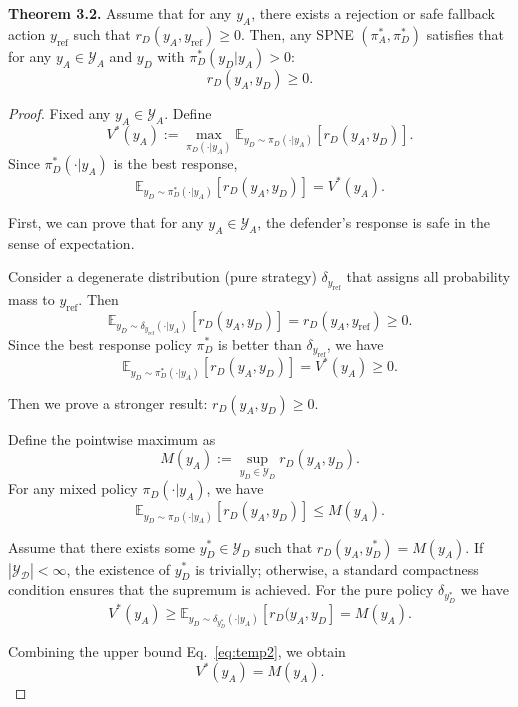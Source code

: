 \documentclass[11pt, letterpaper]{template}
\theoremstyle{plain}
\theoremstyle{definition}
\theoremstyle{remark}
\begin{document}
\textbf{Theorem 3.2.} 
Assume that for any $y_A$, there exists a rejection or safe fallback action $y_{\text{ref}}$ such that $r_D(y_A,y_{\text{ref}}) \geq 0$. Then, any SPNE $(\pi_A^{*},\pi_D^{*})$ satisfies that for any $y_A \in \mathcal{Y}_A$ and  $y_D$ with $\pi_D^{*}(y_D|y_A)>0$:
\begin{equation}
    \label{eq:temp4}
     r_D(y_A,y_D) \geq 0.
\end{equation}
\begin{proof}
    Fixed any $y_A \in \mathcal{Y}_A$. Define 
    \[ V^{*}(y_A) := \max_{\pi_D(\cdot | y_A)} \mathbb{E}_{y_D \sim \pi_D(\cdot | y_A)} [r_D(y_A,y_D)]. \]
Since $\pi_D^{*}(\cdot | y_A) $ is the best response,
\[ \mathbb{E}_{y_D \sim \pi_D^{*}(\cdot | y_A)} [r_D(y_A,y_D)] = V^{*}(y_A).  \]

First, we can prove that for any $y_A \in \mathcal{Y}_A$, the defender's response is safe  in the sense of expectation. 

Consider a degenerate distribution (pure strategy) $\delta_{y_{\text{ref}}}$ that assigns all probability mass to $y_{\text{ref}}$. Then
\[ \mathbb{E}_{y_D \sim \delta_{y_{\text{ref}}}(\cdot | y_A)}[r_D(y_A,y_D)] =r_D(y_A,y_{\text{ref}}) \geq 0.  \]
Since the best response policy $\pi_D^{*}$ is better than $\delta_{y_{\text{ref}}}$, we have
\begin{equation}
    \label{eq:temp1}
    \mathbb{E}_{y_D \sim \pi_D^{*}(\cdot | y_A)} [r_D(y_A,y_D)] = V^{*}(y_A) \geq 0.
\end{equation}

Then we prove a stronger result: $ r_D(y_A,y_D) \geq 0. $

Define the pointwise maximum as
\[ M(y_A) := \sup_{y_D \in \mathcal{Y}_D} r_D(y_A,y_D).\]
For any mixed policy $\pi_D(\cdot | y_A)$, we have
\begin{equation}
    \label{eq:temp2}
    \mathbb{E}_{y_D \sim \pi_D(\cdot | y_A)}[r_D(y_A,y_D)] \leq M(y_A).
\end{equation}


Assume that there exists some $y_D^{*} \in \mathcal{Y}_D$ such that $r_D(y_A,y_D^{*}) = M(y_A)$. If $|\mathcal{Y_D}| < \infty$, the existence of $y_D^{*} $ is trivially; otherwise, a standard compactness condition ensures that the supremum is achieved. For the pure policy $\delta_{y_D^{*}}$ we have
\[V^{*}(y_A) \geq \mathbb{E}_{y_D \sim \delta_{y_D^{*}}(\cdot | y_A)} [r_D(y_A,y_D] = M(y_A).  \]

Combining the upper bound Eq.~\eqref{eq:temp2}, we obtain 
\[ V^{*}(y_A) = M(y_A).\]


\end{proof}
\end{document}

